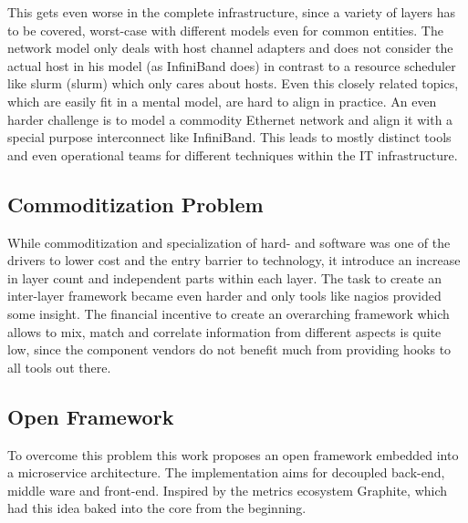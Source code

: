 This gets even worse in the complete infrastructure, since a variety of layers has to be covered, worst-case with different models even for common entities.
The network model only deals with host channel adapters and does not consider the actual host in his model (as InfiniBand does) in contrast to a resource
scheduler like \gls{slurm} (\glsdesc{slurm}) which only cares about hosts. Even this closely related topics, which are easily fit in a mental model, are hard to align in practice.
An even harder challenge is to model a commodity Ethernet network and align it with a special purpose interconnect like InfiniBand.
This leads to mostly distinct tools and even operational teams for different techniques within the IT infrastructure.

\subsection{Commoditization Problem}
While commoditization and specialization of hard- and software was one of the drivers to lower cost and the entry barrier to technology, it introduce an increase in layer count and
independent parts within each layer. The task to create an inter-layer framework became even harder and only tools like \gls{nagios} provided some insight.
The financial incentive to create an overarching framework which allows to mix, match and correlate information from different aspects is quite low, since the component vendors
do not benefit much from providing hooks to all tools out there.

\subsection{Open Framework}
To overcome this problem this work proposes an open framework embedded into a microservice architecture. The implementation aims for decoupled back-end, middle ware and front-end.
Inspired by the metrics ecosystem Graphite, which had this idea baked into the core from the beginning.

